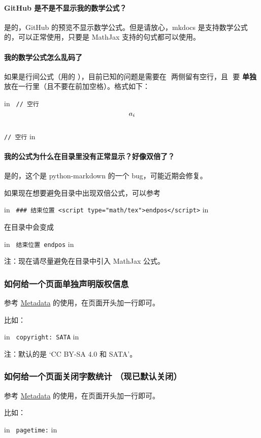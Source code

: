 \paragraph{GitHub 是不是不显示我的数学公式？}

是的，GitHub 的预览不显示数学公式。但是请放心，mkdocs 是支持数学公式的，可以正常使用，只要是 MathJax 支持的句式都可以使用。

\paragraph{我的数学公式怎么乱码了}

如果是行间公式（用的 \texttt{$$}），目前已知的问题是需要在 \texttt{$$} 两侧留有空行，且 \texttt{$$} 要 \textbf{单独} 放在一行里（且不要在前加空格）。格式如下：

 in
\texttt{
// 空行\\$$\\a_i\\$$\\// 空行}
 in

\paragraph{我的公式为什么在目录里没有正常显示？好像双倍了？}

是的，这个是 python-markdown 的一个 bug，可能近期会修复。

如果现在想要避免目录中出现双倍公式，可以参考 \href{https://github.com/24OI/OI-wiki/blame/master/docs/string/sam.md#L82}{}

 in
\texttt{
### 结束位置 <script type="math/tex">endpos</script>}
 in

在目录中会变成

 in
\texttt{
结束位置 endpos}
 in

注：现在请尽量避免在目录中引入 MathJax 公式。

\subsubsection{如何给一个页面单独声明版权信息}

参考 \href{https://squidfunk.github.io/mkdocs-material/extensions/metadata/#usage}{Metadata} 的使用，在页面开头加一行即可。

比如：

 in
\texttt{
copyright: SATA}
 in

注：默认的是 ‘CC BY-SA 4.0 和 SATA’。

\subsubsection{如何给一个页面关闭字数统计 （现已默认关闭）}

参考 \href{https://squidfunk.github.io/mkdocs-material/extensions/metadata/#usage}{Metadata} 的使用，在页面开头加一行即可。

比如：

 in
\texttt{
pagetime:}
 in
